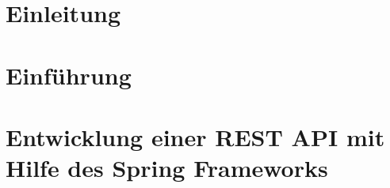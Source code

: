 \section{Einleitung}
  \label{Einleitung}  
  
\pagebreak

\section{Einführung}
  \label{Einführung}
  
\pagebreak

\section{Entwicklung einer REST API mit Hilfe des Spring Frameworks}
  \label{Entwicklung einer REST API mit Hilfe des Spring Frameworks}
  
\pagebreak

\appendix
